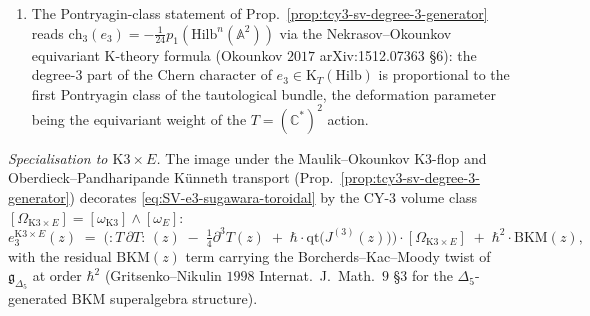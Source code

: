 \begin{proposition}
\begin{enumerate}[label=\textup{(\roman*)}]
quantum-toroidal $\fgl_1$ algebra. At the classical limit $\hbar\to 0$, this
term vanishes as $\hbar\cdot O(1)$.
\item The Pontryagin-class statement of
Prop.~\ref{prop:tcy3-sv-degree-3-generator} reads
$\mathrm{ch}_3(e_3) = -\tfrac{1}{24}p_1(\mathrm{Hilb}^n(\mathbb A^2))$
via the Nekrasov--Okounkov equivariant K-theory formula
(Okounkov $2017$ arXiv:1512.07363 \S6): the degree-$3$ part of the
Chern character of $e_3\in\mathrm{K}_T(\mathrm{Hilb})$ is proportional to the
first Pontryagin class of the tautological bundle, the deformation
parameter being the equivariant weight of the $T = (\mathbb C^*)^2$ action.
\end{enumerate}

\emph{Specialisation to $\mathrm{K3}\times E$.} The image under the
Maulik--Okounkov K3-flop and Oberdieck--Pandharipande K\"unneth transport
(Prop.~\ref{prop:tcy3-sv-degree-3-generator}) decorates
\eqref{eq:SV-e3-sugawara-toroidal} by the CY-$3$ volume class
$[\Omega_{\mathrm{K3}\times E}] = [\omega_{\mathrm{K3}}]\wedge[\omega_E]$:
\begin{equation}
\label{eq:SV-e3-K3xE-decorated}
 e_3^{\mathrm{K3}\times E}(z)
 \;=\;
 \bigl(
 :\!T\,\partial T\!:\,(z)\;
 -\;\tfrac14\partial^3 T(z)\;
 +\;\hbar\cdot\mathrm{qt}\!\bigl(J^{(3)}(z)\bigr)
 \bigr)\cdot[\Omega_{\mathrm{K3}\times E}]\;
 +\;\hbar^2\cdot\mathrm{BKM}(z),
\end{equation}
with the residual $\mathrm{BKM}(z)$ term carrying the
Borcherds--Kac--Moody twist of $\mathfrak g_{\Delta_5}$ at
order $\hbar^2$ (Gritsenko--Nikulin $1998$ Internat.\ J.\ Math.\ $9$
\S3 for the $\Delta_5$-generated BKM superalgebra structure).


\end{proposition}
